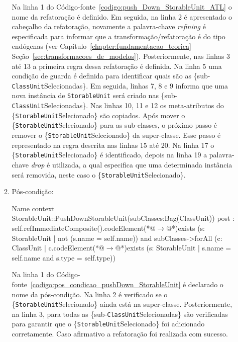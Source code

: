\begin{enumerate}
\begin{enumerate}
Na linha 1 do Código-fonte~\ref{codigo:push_Down_StorableUnit_ATL} o nome da refatoração é definido. Em seguida, na linha 2 é apresentado o cabeçalho da refatoração, novamente a palavra-chave \textit{refining} é especificada para informar que a transformação/refatoração é do tipo endógenas (ver Capítulo~\ref{chapter:fundamentacao_teorica} Seção~\ref{sec:transformacoes_de_modelos}). Posteriormente, nas linhas 3 até 13 a primeira regra dessa refatoração é definida. Na linha 5 uma condição de guarda é definida para identificar quais são as \{sub-\texttt{ClassUnit}Selecionadas\}. Em seguida, linhas 7, 8 e 9 informa que uma nova instância de \texttt{StorableUnit} será criado nas \{sub-\texttt{ClassUnit}Selecionadas\}. Nas linhas 10, 11 e 12 os meta-atributos do \{\texttt{StorableUnit}Selecionado\} são copiados. Após mover o \{\texttt{StorableUnit}Selecionado\} para as sub-classes, o próximo passo é remover o \{\texttt{StorableUnit}Selecionado\} da super-classe. Esse passo é representado na regra descrita nas linhas 15 até 20. Na linha 17 o \{\texttt{StorableUnit}Selecionado\} é identificado, depois na linha 19 a palavra-chave \textit{drop} é utilizada, a qual especifica que uma determinada instância será removida, neste caso o \{\texttt{StorableUnit}Selecionado\}.   
			\item Pós-condição:
			 \begin{codigo}[caption={[OCL representando a pós-condição da refatoração \textit{Push Down StorableUnit}.] Pós-condição da refatoração \textit{Push Down StorableUnit}.},escapeinside={(*@}{@*)}, basicstyle=\footnotesize, label={codigo:pos_condicao_pushDown_StorableUnit}, language=OCL]{Name}
context StorableUnit::PushDownStorableUnit(subClasses:Bag(ClassUnit))
post : self.refImmediateComposite().codeElement(*@$\rightarrow$@*)exists (s: StorableUnit | not (s.name = self.name)) 
and subClasses->forAll (c: ClassUnit | c.codeElement(*@$\rightarrow$@*)exists (s: StorableUnit | s.name = self.name and s.type = self.type))
\end{codigo}
Na linha 1 do Código-fonte~\ref{codigo:pos_condicao_pushDown_StorableUnit} é declarado o nome da pós-condição. Na linha 2 é verificado se o \{\texttt{StorableUnit}Selecionado\} ainda está na super-classe. Posteriormente, na linha 3, para todas as \{sub-\texttt{ClassUnit}Selecionadas\} são verificadas para garantir que o \{\texttt{StorableUnit}Selecionado\} foi adicionado corretamente. Caso afirmativo a refatoração foi realizada com sucesso.
		\end{enumerate}
	\end{enumerate}		
	
